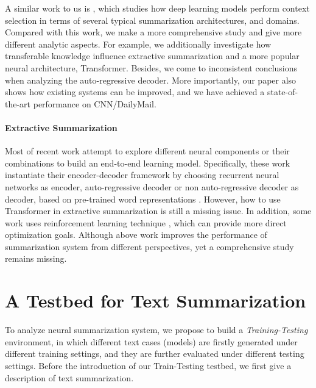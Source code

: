 \documentclass[11pt,a4paper]{article}
\begin{document}
A similar work to us is \citet{kedzie2018content}, which studies how deep learning models perform context selection in terms of several typical summarization architectures, and domains. Compared with this work, we make a more comprehensive study and give more different analytic aspects. For example, we additionally investigate how transferable knowledge influence extractive summarization and a more popular neural architecture, Transformer. Besides, we come to inconsistent conclusions when analyzing the auto-regressive decoder. More importantly, our paper also shows how existing systems can be improved, and we have achieved a state-of-the-art performance on CNN/DailyMail.







\paragraph{Extractive Summarization}
Most of recent work attempt to explore different neural components or their combinations to build an end-to-end learning model. Specifically, these work instantiate their encoder-decoder framework by choosing recurrent neural networks \cite{cheng2016neural, nallapati2017summarunner, zhou2018neural} as encoder, auto-regressive decoder \cite{chen2018fast, jadhav2018extractive, zhou2018neural} or non auto-regressive decoder \cite{isonuma2017extractive, narayan2018ranking, arumae2018reinforced} as decoder, based on pre-trained word representations \cite{mikolov2013efficient, pennington2014glove}. However, how to use Transformer in extractive summarization is still a missing issue. In addition, some work uses reinforcement learning technique \cite{narayan2018ranking, wu2018learning, chen2018fast}, which can provide more direct optimization goals.
Although above work improves the performance of summarization system from different perspectives, yet a comprehensive study remains missing.








\section{A Testbed for Text Summarization}


To analyze neural summarization system, we propose to build a \textit{Training-Testing} environment, in which different text cases (models) are firstly generated under different training settings, and they are further evaluated under different testing settings.
Before the introduction of our Train-Testing testbed, we first give a description of text summarization.
\end{document}
